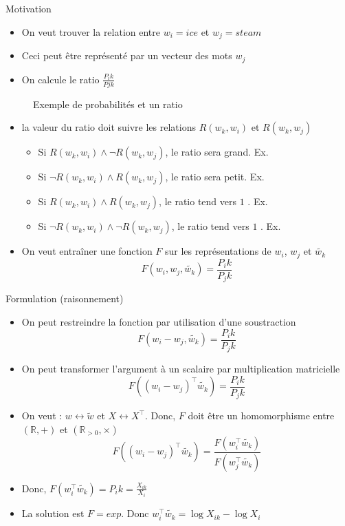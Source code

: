 \documentclass{KodeBook}
\begin{document}
Motivation
\begin{minipage}{.5\textwidth}
	\begin{itemize}
		\item On veut trouver la relation entre $w_i = ice$ et $w_j = steam$
		\item Ceci peut être représenté par un vecteur des mots $w_j$ 
		\item On calcule le ratio $\frac{P_ik}{Pjk}$
	\end{itemize}
\end{minipage}
\begin{figure}
	\caption{Exemple de probabilités et un ratio \cite{2014-pennington-al}}
\end{figure}

\begin{itemize}
	\item la valeur du ratio doit suivre les relations $R(w_k, w_i)$ et $R(w_k, w_j)$
	\begin{itemize}
		\item Si $R(w_k, w_i) \wedge \neg R(w_k, w_j)$, le ratio sera grand. Ex. 
		\item Si $\neg R(w_k, w_i) \wedge R(w_k, w_j)$, le ratio sera petit. Ex. 
		\item Si $R(w_k, w_i) \wedge R(w_k, w_j)$, le ratio tend vers $1$ . Ex. 
		\item Si $\neg R(w_k, w_i) \wedge \neg R(w_k, w_j)$, le ratio tend vers $1$ . Ex. 
	\end{itemize}
	\item On veut entraîner une fonction $F$ sur les représentations de $w_i$, $w_j$ et $\tilde{w_k}$
	\vspace{-6pt}\[F(w_i, w_j, \tilde{w_k}) = \frac{P_ik}{P_jk}\]
\end{itemize}

Formulation (raisonnement)
\begin{itemize}
	\item On peut restreindre la fonction par utilisation d'une soustraction
	\vspace{-6pt}\[F(w_i - w_j, \tilde{w_k}) = \frac{P_ik}{P_jk}\]
	
	\item On peut transformer l'argument à un scalaire par multiplication matricielle
	\vspace{-6pt}\[F((w_i - w_j)^\top \tilde{w_k}) = \frac{P_ik}{P_jk}\]
	
	\item On veut : $w \leftrightarrow \tilde{w}$ et $X \leftrightarrow X^\top$. Donc, $F$ doit être un homomorphisme entre $(\mathbb{R}, +)$ et $(\mathbb{R}_{>0}, \times)$
	\vspace{-6pt}\[F((w_i - w_j)^\top \tilde{w_k}) = \frac{F(w_i^\top \tilde{w_k})}{F(w_j^\top \tilde{w_k})}\]
	
	\item Donc, $F(w_i^\top \tilde{w_k}) = P_ik = \frac{X_{ik}}{X_i}$
	
	\item La solution est $F = exp$. Donc $w_i^\top \tilde{w_k} = \log X_{ik} - \log X_i$
\end{itemize}
\end{document}

